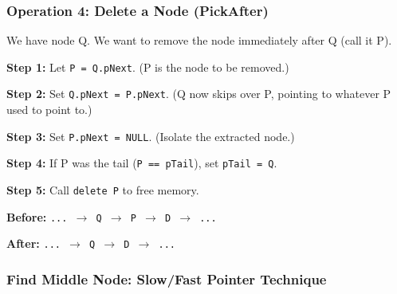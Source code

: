\documentclass[12pt,portrait]{article}
\begin{document}
\subsubsection{Operation 4: Delete a Node (PickAfter)}

\begin{rulebox}
We have node Q. We want to remove the node immediately after Q (call it P).

\textbf{Step 1:} Let \texttt{P = Q.pNext}. (P is the node to be removed.)

\textbf{Step 2:} Set \texttt{Q.pNext = P.pNext}. (Q now skips over P, pointing to whatever P used to point to.)

\textbf{Step 3:} Set \texttt{P.pNext = NULL}. (Isolate the extracted node.)

\textbf{Step 4:} If P was the tail (\texttt{P == pTail}), set \texttt{pTail = Q}.

\textbf{Step 5:} Call \texttt{delete P} to free memory.

\textbf{Before:} \texttt{... $\to$ Q $\to$ P $\to$ D $\to$ ...}

\textbf{After:} \texttt{... $\to$ Q $\to$ D $\to$ ...}
\end{rulebox}

\subsubsection{Find Middle Node: Slow/Fast Pointer Technique}
\end{document}
